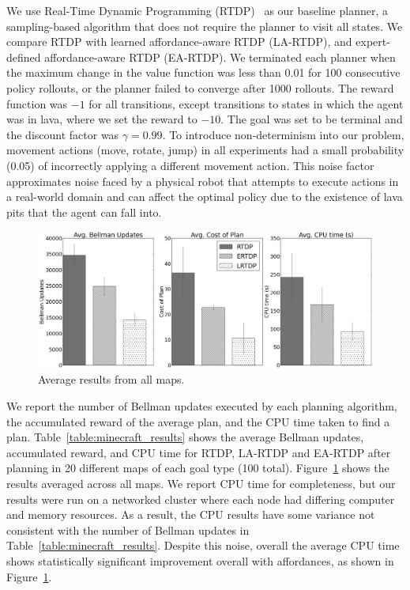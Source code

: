 \documentclass[letterpaper]{article}
\begin{document}
We use Real-Time Dynamic Programming (RTDP)~\cite{barto95} as our
baseline planner, a sampling-based algorithm that does not require the
planner to visit all states. We compare RTDP with learned
affordance-aware RTDP (LA-RTDP), and expert-defined affordance-aware
RTDP (EA-RTDP). We terminated each planner when the maximum change in
the value function was less than 0.01 for 100 consecutive policy
rollouts, or the planner failed to converge after 1000 rollouts.  The
reward function was $-1$ for all transitions, except transitions to
states in which the agent was in lava, where we set the reward to
$-10$. The goal was set to be terminal and the discount factor was
$\gamma = 0.99$.  To introduce non-determinism into our problem,
movement actions (move, rotate, jump) in all experiments had a small
probability (0.05) of incorrectly applying a different movement
action.  This noise factor approximates noise faced by a physical
robot that attempts to execute actions in a real-world domain and
can affect the optimal policy due to the existence of lava pits
that the agent can fall into.

\begin{figure}[t]
\centering
\includegraphics[width=1\linewidth]{figures/average_results_cropped.png}%
\caption{Average results from all maps.}
\label{fig:average_results}
\end{figure}

We report the number of Bellman updates executed by each planning
algorithm, the accumulated reward of the average plan, and the CPU
time taken to find a plan. Table~\ref{table:minecraft_results} shows
the average Bellman updates, accumulated reward, and CPU time for
RTDP, LA-RTDP and EA-RTDP after planning in 20 different maps of each
goal type (100 total). Figure~\ref{fig:average_results} shows the
results averaged across all maps.  We report CPU time for
completeness, but our results were run on a networked cluster where
each node had differing computer and memory resources. As a result,
the CPU results have some variance not consistent with the number of
Bellman updates in Table~\ref{table:minecraft_results}.  Despite this
noise, overall the average CPU time shows statistically significant
improvement overall with affordances, as shown in
Figure~\ref{fig:average_results}.
\end{document}
